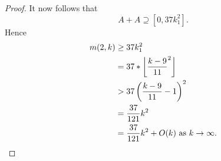 \begin{proof}
It now follows that 
\[
A + A \supseteq [0, 37k_1^2].
\]
Hence
\begin{align*}
m(2,k) &\geq 37k_1^2\\
&= 37 * \left \lfloor \frac{k - 9}{11}^2 \right \rfloor\\
&> 37 \left(\frac{k - 9}{11} -1\right) ^2\\
&= \frac{37}{121}k^2\\
&= \frac{37}{121}k^2 + O(k) \text{ as } k \to \infty. \qedhere
\end{align*}
\end{proof}
